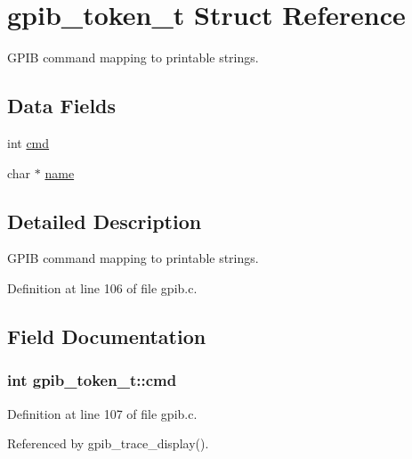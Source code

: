 \hypertarget{structgpib__token__t}{}\section{gpib\+\_\+token\+\_\+t Struct Reference}
\label{structgpib__token__t}


G\+P\+IB command mapping to printable strings.  


\subsection*{Data Fields}
\begin{DoxyCompactItemize}
\item 
int \hyperlink{structgpib__token__t_a8bc698b3cba149e3abbf935e623775c0}{cmd}
\item 
char $\ast$ \hyperlink{structgpib__token__t_aa47fb36b52bd83dc60e67a54f6e36e09}{name}
\end{DoxyCompactItemize}


\subsection{Detailed Description}
G\+P\+IB command mapping to printable strings. 

Definition at line 106 of file gpib.\+c.



\subsection{Field Documentation}
\subsubsection[{\texorpdfstring{cmd}{cmd}}]{\setlength{\rightskip}{0pt plus 5cm}int gpib\+\_\+token\+\_\+t\+::cmd}\hypertarget{structgpib__token__t_a8bc698b3cba149e3abbf935e623775c0}{}\label{structgpib__token__t_a8bc698b3cba149e3abbf935e623775c0}


Definition at line 107 of file gpib.\+c.



Referenced by gpib\+\_\+trace\+\_\+display().

